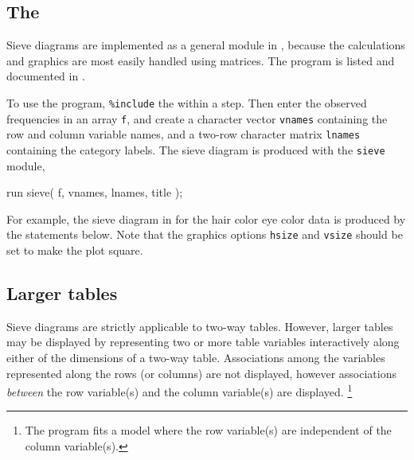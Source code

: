 \subsection{The }
Sieve diagrams are implemented as a general module in \IML{},
because the calculations and graphics are most easily handled using
matrices.
The program is listed and documented in .

To use the program, \texttt{\%include} the 
within a  step.  Then
enter the observed frequencies in an array \texttt{f},
and create a character vector \texttt{vnames} containing
the row and column variable names, and a two-row
character matrix \texttt{lnames} containing the
category labels.
The sieve diagram is produced with the \texttt{sieve} module,
\begin{listing}
run sieve( f, vnames, lnames, title );
\end{listing}
For example, the sieve diagram in 
for the hair color eye color data is produced by the
statements below.
Note that the graphics options \texttt{hsize} and \texttt{vsize}
should be set to make the plot square.


\subsection{Larger tables}
Sieve diagrams are strictly applicable to two-way tables.
However, larger tables may be displayed by representing two or more
table variables interactively along either of the dimensions of a two-way table.
Associations among the variables represented along the rows (or columns)
are not displayed, however associations \emph{between} the row
variable(s) and the column variable(s) are displayed.%
\footnote{The program fits a model where the row variable(s)
are independent of the column variable(s).}

